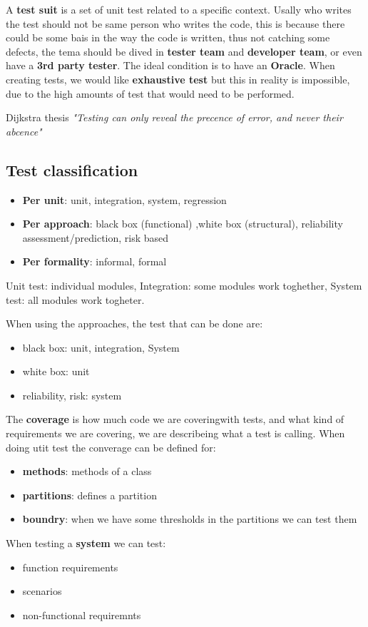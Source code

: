 \documentclass[12pt]{article}
\begin{document}
A \textbf{test suit} is a set of unit test related to a specific context. Usally who writes the test should not be same person who writes the code, this is because there could be some bais in the way the code is written, thus not catching some defects, the tema should be dived in \textbf{tester team} and \textbf{developer team}, or even have a \textbf{3rd party tester}. The ideal condition is to have an \textbf{Oracle}. When creating tests, we would like \textbf{exhaustive test} but this in reality is impossible, due to the high amounts of test that would need to be performed.
\begin{definition}{Dijkstra thesis}{}
  \emph{"Testing can only reveal the precence of error, and never their abcence"}
\end{definition}

\subsection{Test classification}
\begin{itemize}
  \item \textbf{Per unit}: unit, integration, system, regression
  \item \textbf{Per approach}: black box (functional) ,white box (structural), reliability assessment/prediction, risk based
  \item \textbf{Per formality}: informal, formal
\end{itemize}
Unit test: individual modules, Integration: some modules work toghether, System test: all modules work togheter.

When using the approaches, the test that can be done are:
\begin{itemize}
  \item black box: unit, integration, System
  \item white box: unit
  \item reliability, risk: system
\end{itemize}

The \textbf{coverage} is how much code we are coveringwith tests, and what kind of requirements we are covering, we are describeing what a test is calling. When doing utit test the converage can be defined for:
\begin{itemize}
  \item \textbf{methods}: methods of a class
  \item \textbf{partitions}: defines a partition
  \item \textbf{boundry}: when we have some thresholds in the partitions we can test them
\end{itemize}
When testing a \textbf{system} we can test:
\begin{itemize}
  \item function requirements
  \item scenarios
  \item non-functional requiremnts
\end{itemize}
\end{document}
